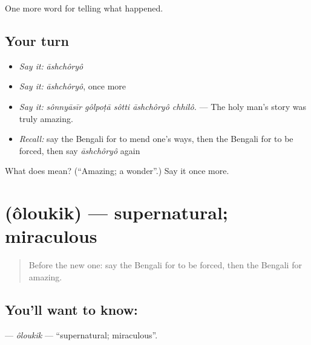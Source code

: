 \begin{grammarlens}[title={What you've built}]
One more word for telling what happened.
\end{grammarlens}

\subsection*{Your turn}
\begin{itemize}
\raggedright
  \item \emph{Say it:} \emph{āshchôryô}
  \item \emph{Say it:} \emph{āshchôryô}, once more
  \item \emph{Say it:} \emph{sônnyāsīr gôlpoṭā sôtti āshchôryô chhilô.} — The holy man's story was truly amazing.
  \item \emph{Recall:} say the Bengali for to mend one's ways, then the Bengali for to be forced, then say \emph{āshchôryô} again
\end{itemize}

\begin{tcolorbox}[breakable,colback=teal!4,colframe=teal!35!black,title={Before you move on}]
What does  mean? (\textquotedblleft{}Amazing; a wonder\textquotedblright{}.) Say it once more.
\end{tcolorbox}
\section[\texorpdfstring{\bn{অলৌকিক} (ôloukik)}{অলৌকিক (ôloukik)}]{ (ôloukik) — supernatural; miraculous}

\label{lesson:BN-C326-oloukik}



\begin{quote}
Before the new one: say the Bengali for to be forced, then the Bengali for amazing.
\end{quote}

\subsection*{You'll want to know: }
\textbf{} — \emph{ôloukik} — \textquotedblleft{}supernatural; miraculous\textquotedblright{}.

\begin{quote}
        
\end{quote}


